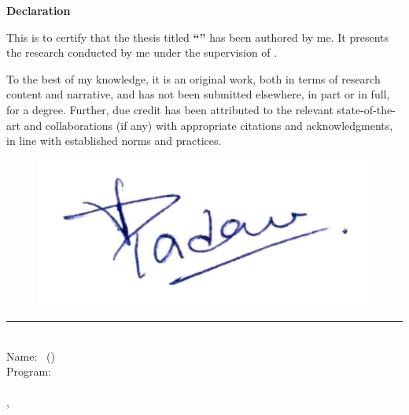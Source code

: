  \vspace*{-0.5in}
 \begin{center}
 	\vspace*{1in}
 	\noindent \textbf{\Large Declaration}\\
 	\vspace*{0.5in}
 \end{center}
 \noindent This is to certify that the thesis titled \textbf{``\textsc{\thesistitle}''} has been authored by me. It presents the research conducted by me under the supervision of \textbf{\textsc{\supname}}.

To the best of my knowledge, it is an original work, both in terms of research content and narrative, and has not been submitted elsewhere, in part or in full, for a degree. Further, due credit has been attributed to the relevant state-of-the-art and collaborations (if any) with appropriate citations and acknowledgments, in line with established norms and practices.

\begin{flushright}
\vspace*{1in}
\begin{figure}[!h]
    \begin{flushright}
    \includegraphics[scale=.3]{images/sign.png}
    \end{flushright}
\end{figure}
\rule[2pt]{2in}{0.5pt}\\
Name: \authorname~(\authorrollno)\\
Program: \degreename\\\deptname\\
\instname, \instaddr\\
\noindent\datesubmission
\end{flushright}
\clearpage

